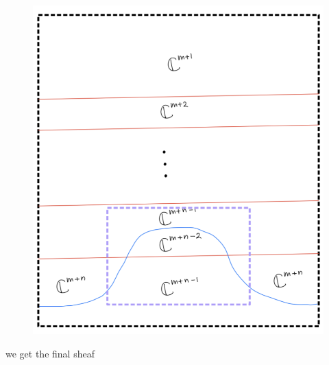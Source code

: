 \begin{enumerate}[label=(\roman*)]
\begin{enumerate}[label=(Step \arabic*)]
\begin{figure}[H]
    \centering
    \includegraphics[scale = 0.95]{diagrams/cobord7/6.png}
    \caption{}
    \label{fig:your-label}
\end{figure}
\pagebreak 
we get the final sheaf


\end{enumerate}
\end{enumerate}
